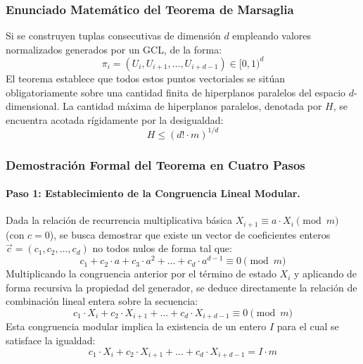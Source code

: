 \documentclass{article}
\begin{document}
\subsubsection{Enunciado Matemático del Teorema de Marsaglia}
Si se construyen tuplas consecutivas de dimensión $d$ empleando valores normalizados generados por un GCL, de la forma:
\begin{equation}
    \pi_i = (U_i, U_{i+1}, \dots, U_{i+d-1}) \in [0, 1)^d
\end{equation}
El teorema establece que todos estos puntos vectoriales se sitúan obligatoriamente sobre una cantidad finita de hiperplanos paralelos del espacio $d$-dimensional. La cantidad máxima de hiperplanos paralelos, denotada por $H$, se encuentra acotada rígidamente por la desigualdad:
\begin{equation}
    H \le (d! \cdot m)^{1/d}
\end{equation}

\subsubsection{Demostración Formal del Teorema en Cuatro Pasos}

\paragraph{Paso 1: Establecimiento de la Congruencia Lineal Modular.}
Dada la relación de recurrencia multiplicativa básica $X_{i+1} \equiv a \cdot X_i \pmod{m}$ (con $c=0$), se busca demostrar que existe un vector de coeficientes enteros $\vec{c} = (c_1, c_2, \dots, c_d)$ no todos nulos de forma tal que:
\begin{equation}
    c_1 + c_2 \cdot a + c_3 \cdot a^2 + \dots + c_d \cdot a^{d-1} \equiv 0 \pmod{m}
\end{equation}
Multiplicando la congruencia anterior por el término de estado $X_i$ y aplicando de forma recursiva la propiedad del generador, se deduce directamente la relación de combinación lineal entera sobre la secuencia:
\begin{equation}
    c_1 \cdot X_i + c_2 \cdot X_{i+1} + \dots + c_d \cdot X_{i+d-1} \equiv 0 \pmod{m}
\end{equation}
Esta congruencia modular implica la existencia de un entero $I$ para el cual se satisface la igualdad:
\begin{equation}
    c_1 \cdot X_i + c_2 \cdot X_{i+1} + \dots + c_d \cdot X_{i+d-1} = I \cdot m
\end{equation}
\end{document}
